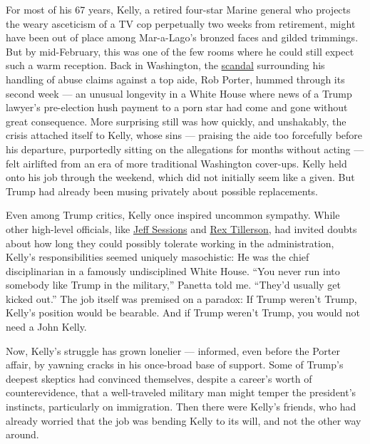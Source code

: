 For most of his 67 years, Kelly, a retired four-star Marine general who
projects the weary asceticism of a TV cop perpetually two weeks from
retirement, might have been out of place among Mar-a-Lago's bronzed
faces and gilded trimmings. But by mid-February, this was one of the few
rooms where he could still expect such a warm reception. Back in
Washington, the
\href{https://www.nytimes3xbfgragh.onion/2018/02/19/us/politics/trump-kelly-porter.html}{scandal}
surrounding his handling of abuse claims against a top aide, Rob Porter,
hummed through its second week --- an unusual longevity in a White House
where news of a Trump lawyer's pre-election hush payment to a porn star
had come and gone without great consequence. More surprising still was
how quickly, and unshakably, the crisis attached itself to Kelly, whose
sins --- praising the aide too forcefully before his departure,
purportedly sitting on the allegations for months without acting ---
felt airlifted from an era of more traditional Washington cover-ups.
Kelly held onto his job through the weekend, which did not initially
seem like a given. But Trump had already been musing privately about
possible replacements.

Even among Trump critics, Kelly once inspired uncommon sympathy. While
other high-level officials, like
\href{https://www.nytimes3xbfgragh.onion/2017/07/19/us/politics/trump-interview-sessions-russia.html}{Jeff
Sessions} and
\href{https://www.nytimes3xbfgragh.onion/2017/10/17/magazine/rex-tillerson-and-the-unraveling-of-the-state-department.html}{Rex
Tillerson}, had invited doubts about how long they could possibly
tolerate working in the administration, Kelly's responsibilities seemed
uniquely masochistic: He was the chief disciplinarian in a famously
undisciplined White House. ``You never run into somebody like Trump in
the military,'' Panetta told me. ``They'd usually get kicked out.'' The
job itself was premised on a paradox: If Trump weren't Trump, Kelly's
position would be bearable. And if Trump weren't Trump, you would not
need a John Kelly.

Now, Kelly's struggle has grown lonelier --- informed, even before the
Porter affair, by yawning cracks in his once-broad base of support. Some
of Trump's deepest skeptics had convinced themselves, despite a career's
worth of counterevidence, that a well-traveled military man might temper
the president's instincts, particularly on immigration. Then there were
Kelly's friends, who had already worried that the job was bending Kelly
to its will, and not the other way around.

